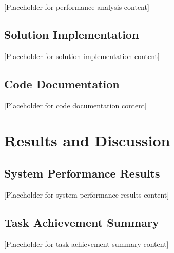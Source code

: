 \documentclass[12pt,a4paper]{article}
\begin{document}

[Placeholder for performance analysis content]


\subsection{Solution Implementation}


[Placeholder for solution implementation content]

\subsection{Code Documentation}


[Placeholder for code documentation content]

\section{Results and Discussion}


\subsection{System Performance Results}


[Placeholder for system performance results content]

\subsection{Task Achievement Summary}


[Placeholder for task achievement summary content]
\end{document}

